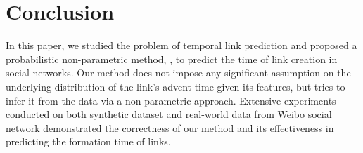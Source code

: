 \section{Conclusion}\label{sec:conclusion}
In this paper, we studied the problem of temporal link prediction and proposed a probabilistic non-parametric method, \npglm, to predict the time of link creation in social networks. Our method does not impose any significant assumption on the underlying distribution of the link's advent time given its features, but tries to infer it from the data via a non-parametric approach. Extensive experiments conducted on both synthetic dataset and real-world data from Weibo social network demonstrated the correctness of our method and its effectiveness in predicting the formation time of links.\\